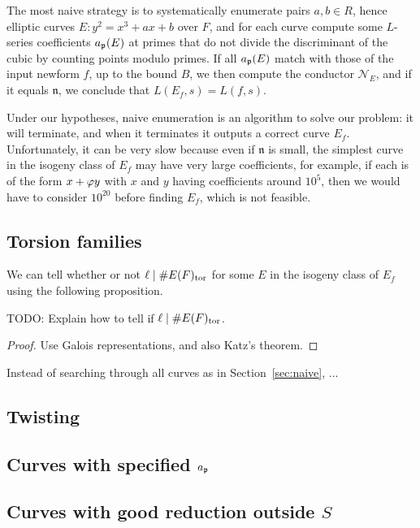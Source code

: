 \documentclass{amsart}
\newcommand{\n}{\mathfrak{n}}
\newcommand{\cN}{\mathcal{N}}
\begin{document}
The most naive strategy is to systematically enumerate pairs $a,b\in
R$, hence elliptic curves $E: y^2 = x^3 + ax + b$ over $F$, and for
each curve compute some $L$-series coefficients $a_{\mathfrak{p}}(E)$ at primes
that do not divide the discriminant of the cubic by counting points
modulo primes.  If all $a_{\mathfrak{p}}(E)$ match with those of the input newform
$f$, up to the bound $B$, we then compute the conductor $\cN_E$, and
if it equals $\n$, we conclude that $L(E_f,s) = L(f,s)$.

Under our hypotheses, naive enumeration is an algorithm to solve our
problem: it will terminate, and when it terminates it outputs a
correct curve $E_f$. Unfortunately, it can be very slow because even
if $\n$ is small, the simplest curve in the isogeny class of $E_f$ may
have very large coefficients, for example, if each is of the form
$x+\varphi y$ with $x$ and $y$ having coefficients around $10^5$, then
we would have to consider $10^{20}$ before finding $E_f$, which is not
feasible.

\subsection{Torsion families}\label{sec:torsion}

We can tell whether or not $\ell\mid \#E(F)_{\operatorname{tor}}$ for some
$E$ in the isogeny class of $E_f$ using the following proposition.

\begin{proposition}
 TODO: Explain how to tell if $\ell\mid \#E(F)_{\operatorname{tor}}$.
\end{proposition}
\begin{proof}
  Use Galois representations, and also Katz's theorem.
\end{proof}

Instead of searching through all curves as in Section~\ref{sec:naive},
...


\subsection{Twisting}

\subsection{Curves with specified $a_{\mathfrak{p}}$}

\subsection{Curves with good reduction outside $S$}
\end{document}
